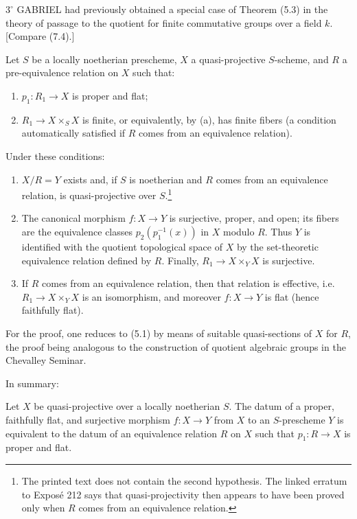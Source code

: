 \smallskip
\noindent $3^\circ$ GABRIEL had previously obtained a special case of Theorem
(5.3) in the theory of passage to the quotient for finite commutative groups
over a field $k$. [Compare (7.4).]


 Let $S$ be a locally noetherian prescheme, $X$ a
quasi-projective $S$-scheme, and $R$ a pre-equivalence relation on $X$ such
that:
\begin{enumerate}
\item[(a)] $p_1:R_1\to X$ is proper and flat;
\item[(b)] $R_1\to X\times_S X$ is finite, or equivalently, by (a), has
finite fibers (a condition automatically satisfied if $R$ comes from an
equivalence relation).
\end{enumerate}
Under these conditions:
\begin{enumerate}
\item[(i)] $X/R=Y$ exists and, if $S$ is noetherian and $R$ comes from an
equivalence relation, is quasi-projective over $S$.\footnote{The printed text
does not contain the second hypothesis. The linked erratum to Exposé 212 says
that quasi-projectivity then appears to have been proved only when $R$ comes
from an equivalence relation.}

\item[(ii)] The canonical morphism $f:X\to Y$ is surjective, proper, and open;
its fibers are the equivalence classes $p_2(p_1^{-1}(x))$ in $X$ modulo $R$.
Thus $Y$ is identified with the quotient topological space of $X$ by the
set-theoretic equivalence relation defined by $R$. Finally,
$R_1\to X\times_Y X$ is surjective.

\item[(iii)] If $R$ comes from an equivalence relation, then that relation is
effective, i.e. $R_1\to X\times_Y X$ is an isomorphism, and moreover
$f:X\to Y$ is flat (hence faithfully flat).
\end{enumerate}

For the proof, one reduces to (5.1) by means of suitable quasi-sections of $X$
for $R$, the proof being analogous to the construction of quotient algebraic
groups in the Chevalley Seminar.

In summary:

 Let $X$ be quasi-projective over a locally noetherian
$S$. The datum of a proper, faithfully flat, and surjective morphism
$f:X\to Y$ from $X$ to an $S$-prescheme $Y$ is equivalent to the datum of an
equivalence relation $R$ on $X$ such that $p_1:R\to X$ is proper and flat.

